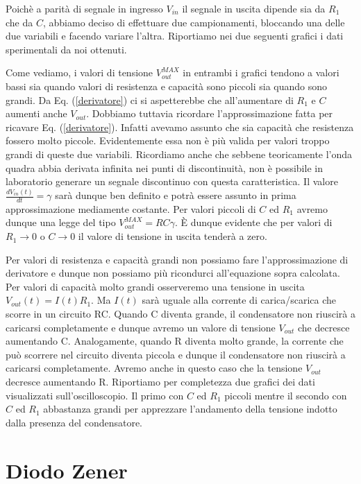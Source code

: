 Poichè a parità di segnale in ingresso $V_{in}$ il segnale in uscita dipende sia da $R_1$ che da $C$, abbiamo deciso di effettuare due campionamenti, bloccando una delle due variabili e facendo variare l'altra. Riportiamo nei due seguenti grafici i dati sperimentali da noi ottenuti.




Come vediamo, i valori di tensione $V_{out}^{MAX}$ in entrambi i grafici tendono a valori bassi sia quando valori di resistenza e capacità sono piccoli sia quando sono grandi. Da Eq. (\ref{derivatore}) ci si aspetterebbe che all'aumentare di $R_1$ e $C$ aumenti anche $V_{out}$. Dobbiamo tuttavia ricordare l'approssimazione fatta per ricavare Eq. (\ref{derivatore}). Infatti avevamo assunto che sia capacità che resistenza fossero molto piccole. Evidentemente essa non è più valida per valori troppo grandi di queste due variabili. Ricordiamo anche che sebbene teoricamente l'onda quadra abbia derivata infinita nei punti di discontinuità, non è possibile in laboratorio generare un segnale discontinuo con questa caratteristica. Il valore $\frac{dV_{in}(t)}{dt}=\gamma$  sarà dunque ben definito e potrà essere assunto in prima approssimazione mediamente costante. Per valori piccoli di $C$ ed $R_1$ avremo dunque una legge del tipo $V_{out}^{MAX}= RC \gamma$. \`E dunque evidente che per valori di $R_1\rightarrow 0$ o $C\rightarrow 0$ il valore di tensione in uscita tenderà a zero.

Per valori di resistenza e capacità grandi non possiamo fare l'approssimazione di derivatore e dunque non possiamo più ricondurci all'equazione sopra calcolata. Per valori di capacità molto grandi osserveremo una tensione in uscita $V_{out}(t)=I(t) R_1$. Ma $I(t)$ sarà uguale alla corrente di carica/scarica che scorre in un circuito RC. Quando C diventa grande, il condensatore non riuscirà a caricarsi completamente e dunque avremo un valore di tensione $V_{out}$ che decresce aumentando C. Analogamente, quando R diventa molto grande, la corrente che può scorrere nel circuito diventa piccola e dunque il condensatore non riuscirà a caricarsi completamente. Avremo anche in questo caso che la tensione $V_{out}$ decresce aumentando R. Riportiamo per completezza due grafici dei dati visualizzati sull'oscilloscopio. Il primo con $C$ ed $R_1$ piccoli mentre il secondo con $C$ ed $R_1$ abbastanza grandi per apprezzare l'andamento della tensione indotto dalla presenza del condensatore.

\section{Diodo Zener}

